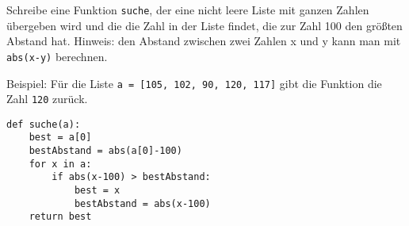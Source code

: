\question[4]
Schreibe eine Funktion \texttt{suche}, der eine nicht leere Liste mit
ganzen Zahlen übergeben wird und die die Zahl in der Liste findet,
die zur Zahl 100 den größten Abstand hat.
Hinweis: den Abstand zwischen zwei Zahlen x und y kann man mit
\texttt{abs(x-y)} berechnen.

Beispiel: Für die Liste \texttt{a = [105, 102, 90, 120, 117]} gibt die Funktion
die Zahl \texttt{120} zurück.

\begin{solutionbox}{9cm}
\begin{lstlisting}
def suche(a):
    best = a[0]
    bestAbstand = abs(a[0]-100)
    for x in a:
        if abs(x-100) > bestAbstand:
            best = x
            bestAbstand = abs(x-100)
    return best
\end{lstlisting}
\end{solutionbox}
